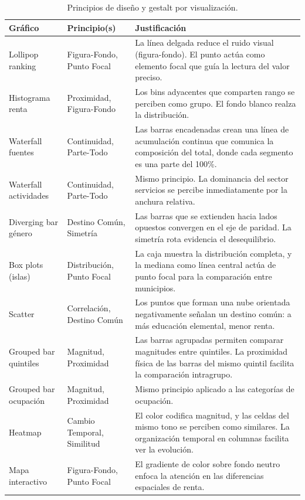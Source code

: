 \documentclass[spanish,a4paper,12pt,oneside]{extreport}
\begin{document}
\begin{table}[H]
\centering
\small
\begin{tabular}{lp{4cm}p{7cm}}
\toprule
Gráfico & Principio(s) & Justificación \\
\midrule
Lollipop ranking & Figura-Fondo, Punto Focal & La línea delgada reduce el ruido visual (figura-fondo). El punto actúa como elemento focal que guía la lectura del valor preciso. \\
\addlinespace
Histograma renta & Proximidad, Figura-Fondo & Los bins adyacentes que comparten rango se perciben como grupo. El fondo blanco realza la distribución. \\
\addlinespace
Waterfall fuentes & Continuidad, Parte-Todo & Las barras encadenadas crean una línea de acumulación continua que comunica la composición del total, donde cada segmento es una parte del 100\%. \\
\addlinespace
Waterfall actividades & Continuidad, Parte-Todo & Mismo principio. La dominancia del sector servicios se percibe inmediatamente por la anchura relativa. \\
\addlinespace
Diverging bar género & Destino Común, Simetría & Las barras que se extienden hacia lados opuestos convergen en el eje de paridad. La simetría rota evidencia el desequilibrio. \\
\addlinespace
Box plots (islas) & Distribución, Punto Focal & La caja muestra la distribución completa, y la mediana como línea central actúa de punto focal para la comparación entre municipios. \\
\addlinespace
Scatter & Correlación, Destino Común & Los puntos que forman una nube orientada negativamente señalan un destino común: a más educación elemental, menor renta. \\
\addlinespace
Grouped bar quintiles & Magnitud, Proximidad & Las barras agrupadas permiten comparar magnitudes entre quintiles. La proximidad física de las barras del mismo quintil facilita la comparación intragrupo. \\
\addlinespace
Grouped bar ocupación & Magnitud, Proximidad & Mismo principio aplicado a las categorías de ocupación. \\
\addlinespace
Heatmap & Cambio Temporal, Similitud & El color codifica magnitud, y las celdas del mismo tono se perciben como similares. La organización temporal en columnas facilita ver la evolución. \\
\addlinespace
Mapa interactivo & Figura-Fondo, Punto Focal & El gradiente de color sobre fondo neutro enfoca la atención en las diferencias espaciales de renta. \\
\bottomrule
\end{tabular}
\caption{Principios de diseño y gestalt por visualización.}
\end{table}
\end{document}
